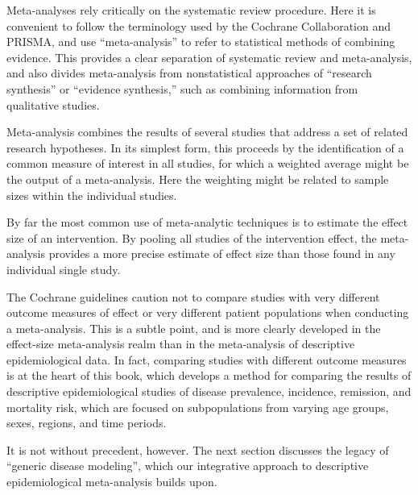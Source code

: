 Meta-analyses rely critically on the systematic review procedure. Here
it is convenient to follow the terminology used by the Cochrane
Collaboration and PRISMA, and use ``meta-analysis'' to refer to
statistical methods of combining evidence.  This provides a clear
separation of systematic review and meta-analysis, and also divides
meta-analysis from nonstatistical approaches of ``research
synthesis'' or ``evidence synthesis,'' such as combining information
from qualitative studies.

Meta-analysis combines the results of several studies that address a
set of related research hypotheses. In its simplest form, this
proceeds by the identification of a common measure of interest in all studies, for
which a weighted average might be the output of a meta-analysis. Here
the weighting might be related to sample sizes within the individual
studies.

By far the most common use of meta-analytic techniques is to estimate
the effect size of an intervention.  By pooling all studies of the
intervention effect, the meta-analysis provides a more precise
estimate of effect size than those found in any individual single
study.

The Cochrane guidelines caution not to compare studies with very
different outcome measures of effect or very different patient
populations when conducting a
meta-analysis.\cite{_cochrane_2012} This is a subtle point,
and is more clearly developed in the effect-size meta-analysis realm
than in the meta-analysis of descriptive epidemiological data.  In
fact, comparing studies with different outcome measures is at the
heart of this book, which develops a method for comparing the results
of descriptive epidemiological studies of disease prevalence,
incidence, remission, and mortality risk, which are focused on
subpopulations from varying age groups, sexes, regions, and time
periods.

It is not without precedent, however.  The next section discusses the
legacy of ``generic disease modeling'', which our integrative approach
to descriptive epidemiological meta-analysis builds upon.



